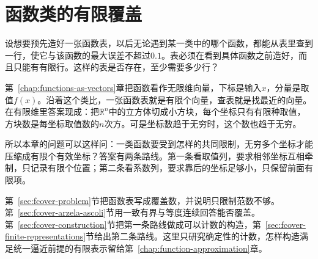 \chapter{函数类的有限覆盖}
\label{chap:function-class-covers}

设想要预先造好一张函数表，以后无论遇到某一类中的哪个函数，都能从表里查到一行，使它与该函数的最大误差不超过$0.1$。表必须在看到具体函数之前造好，而且只能有有限行。这样的表是否存在，至少需要多少行？

第~\ref{chap:functions-as-vectors}章把函数看作无限维向量，下标是输入$x$，分量是取值$f(x)$。沿着这个类比，一张函数表就是有限个向量，查表就是找最近的向量。在有限维里答案现成：把$\mathbb R^n$中的立方体切成小方块，每个坐标只有有限种取值，方块数是每坐标取值数的$n$次方。可是坐标数趋于无穷时，这个数也趋于无穷。

所以本章的问题可以这样问：一类函数要受到怎样的共同限制，无穷多个坐标才能压缩成有限个有效坐标？答案有两条路线。第一条看取值列，要求相邻坐标互相牵制，只记录有限个位置；第二条看系数列，要求靠后的坐标足够小，只保留前面有限项。

第~\ref{sec:fcover-problem}节把函数表写成覆盖数，并说明只限制范数不够。第~\ref{sec:fcover-arzela-ascoli}节用一致有界与等度连续回答能否覆盖。第~\ref{sec:fcover-construction}节把第一条路线做成可以计数的构造，第~\ref{sec:fcover-finite-representations}节给出第二条路线。这里只研究确定性的计数，怎样构造满足统一逼近前提的有限表示留给第~\ref{chap:function-approximation}章。







